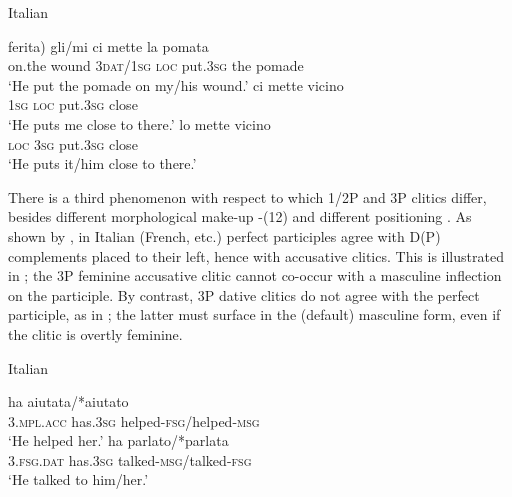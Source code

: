 \documentclass[output=paper]{langscibook}
\begin{document}
\ea\label{ex:manzini:}
Italian\\
\begin{xlist}
\ex {} {ferita)}   {gli/mi}    {ci}   {mette} {la} {pomata}\\
on.the wound   \textsc{3dat/1sg}   \textsc{loc}   put.\textsc{3sg} the pomade\\
\glt ‘He put the pomade on my/his wound.’
\ex {}  {ci}   {mette}   {vicino}\\
\textsc{1sg}  \textsc{loc}  put.\textsc{3sg} close\\
\glt ‘He puts me close to there.’
\ex {}  {lo}  {mette}   {vicino}\\
\textsc{loc}  \textsc{3sg}   put.\textsc{3sg} close\\
\glt ‘He puts it/him close to there.’
\end{xlist}
\z

There is a third phenomenon with respect to which 1/2P and 3P clitics differ, besides different morphological make-up -(12) and different positioning . As shown by \citet{Kayne1989}, in Italian (French, etc.) perfect participles agree with D(P) complements placed to their left, hence with accusative clitics. This is illustrated in ; the 3P feminine accusative clitic cannot co-occur with a masculine inflection on the participle. By contrast, 3P dative clitics do not agree with the perfect participle, as in ; the latter must surface in the (default) masculine form, even if the clitic is overtly feminine.

\ea\label{ex:manzini:}
Italian\\
\begin{xlist}
\ex {}     {ha}     {aiutata/*aiutato}\\
\textsc{3.mpl.acc}  has.\textsc{3sg}    helped-\textsc{fsg/}helped\textsc{{}-msg}\\
\glt ‘He helped her.’
\ex {}       {ha}     {parlato/*parlata}\\
\textsc{3.fsg.dat}  has.\textsc{3sg}    talked-\textsc{msg/}talked\textsc{{}-fsg}\\
\glt ‘He talked to him/her.’
\end{xlist}
\z
 
\end{document}
